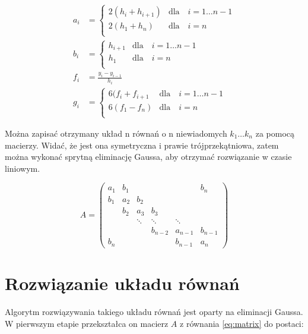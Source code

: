 \documentclass[11pt,wide]{mwart}
\begin{document}
\begin{align}
	a_i &= 
		\begin{cases}
			2(h_i + h_{i+1})   & \text{dla} \quad i = 1 \ldots n-1 \\
			2(h_1 + h_n)	   & \text{dla} \quad i = n \\
		\end{cases} \\
	b_i &=
		\begin{cases}
			h_{i+1} 	& \text{dla} \quad i = 1 \ldots n-1 \\
			h_1	   		& \text{dla} \quad i = n \\
		\end{cases} \\
	f_i &=\frac{y_i - y_{i-1}}{h_i} \\
	g_i &=
		\begin{cases}
			6(f_i + f_{i+1}   & \text{dla} \quad i = 1 \ldots n-1 \\
			6(f_1 - f_n)	  & \text{dla} \quad i = n \\
		\end{cases}
\end{align}

Można zapisać otrzymany układ n równań o n niewiadomych $ k_1 \ldots k_n $ za pomocą macierzy. Widać, że jest ona symetryczna i prawie trójprzekątniowa, zatem można wykonać sprytną eliminację Gaussa, aby otrzymać rozwiązanie w czasie liniowym.

\begin{equation} A = 
\left(\begin{matrix}
	a_1 & b_1 &     	&      		&			& b_n 		\\
	b_1 & a_2 & b_2 	&     		 						\\  
	    & b_2 & a_3 	& b_3 		& 						\\
	    &	  & \ddots	& \ddots  	& \ddots 				\\
	    &     & 		& b_{n-2}	& a_{n-1} 	& b_{n-1}	\\
	b_n & 	  &     	&			& b_{n-1} 	& a_n
\end{matrix}\right) \label{eq:matrix}
\end{equation}

\section{Rozwiązanie układu równań}

Algorytm rozwiązywania takiego układu równań jest oparty na eliminacji Gaussa. W pierwszym etapie przekształca on macierz $ A $ z równania \eqref{eq:matrix} do postaci:
\end{document}
